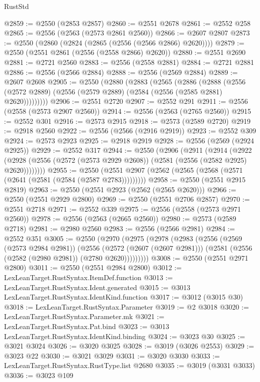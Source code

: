 \begin{lexlean}{RustStd}
\begin{coremodule}
{\begin{coremodule}
{{{{{{{{{{{{{{{{{{{{{{{{{{{{{{{{@2859 := @2550 (@2853 @2857)
@2860 := @2551 @2678
@2861 := @2552 @258
@2865 := @2556 (@2563 (@2573 @2861 @2560))
@2866 := @2607 @2807
@2873 := @2550 (@2860 (@2824 (@2865 (@2556 (@2566 @2866) @2620))))
@2879 := @2550 (@2551 @2861 (@2556 (@2558 @2866) @2620))
@2880 := @2551 @2690
@2881 := @2721 @2560
@2883 := @2556 (@2558 @2881)
@2884 := @2721 @2881
@2886 := @2556 (@2566 @2884)
@2888 := @2556 (@2569 @2884)
@2889 := @2607 @2608
@2905 := @2550
    (@2880
      (@2883
        (@2565
          (@2886
            (@2888
              (@2556 (@2572 @2889) (@2556 (@2579 @2889) (@2584 (@2556 (@2585 @2881) @2620)))))))))
@2906 := @2551 @2720
@2907 := @2552 @291
@2911 := @2556 (@2558 (@2573 @2907 @2560))
@2914 := @2556 (@2563 (@2765 @2560))
@2915 := @2552 @301
@2916 := @2573 @2915
@2918 := @2573 (@2589 @2720)
@2919 := @2918 @2560
@2922 := @2556 (@2566 (@2916 @2919))
@2923 := @2552 @309
@2924 := @2573 @2923
@2925 := @2918 @2919
@2928 := @2556 (@2569 (@2924 @2925))
@2929 := @2552 @317
@2944 := @2550
    (@2906
      (@2911
        (@2914
          (@2922 (@2928 (@2556 (@2572 (@2573 @2929 @2608)) (@2581 (@2556 (@2582 @2925) @2620))))))))
@2955 := @2550 (@2551 @2907 (@2562 (@2565 (@2568 (@2571 (@2641 (@2581 (@2584 (@2587 @2783)))))))))
@2958 := @2550 (@2551 @2915 @2819)
@2963 := @2550 (@2551 @2923 (@2562 (@2565 @2620)))
@2966 := @2550 (@2551 @2929 @2800)
@2969 := @2550 (@2551 @2706 @2857)
@2970 := @2551 @2718
@2971 := @2552 @339
@2975 := @2556 (@2558 (@2573 @2971 @2560))
@2978 := @2556 (@2563 (@2665 @2560))
@2980 := @2573 (@2589 @2718)
@2981 := @2980 @2560
@2983 := @2556 (@2566 @2981)
@2984 := @2552 @351
@3005 := @2550
    (@2970
      (@2975
        (@2978
          (@2983
            (@2556
              (@2569 (@2573 @2984 @2981))
              (@2556
                (@2572 (@2607 (@2607 @2981)))
                (@2581 (@2556 (@2582 (@2980 @2981)) (@2780 @2620)))))))))
@3008 := @2550 (@2551 @2971 @2800)
@3011 := @2550 (@2551 @2984 @2800)
@3012 := LexLeanTarget.RustSyntax.ItemDef.function
@3013 := LexLeanTarget.RustSyntax.Ident.generated
@3015 := @3013 LexLeanTarget.RustSyntax.IdentKind.function
@3017 := @3012 (@3015 @30)
@3018 := LexLeanTarget.RustSyntax.Parameter
@3019 := @2 @3018
@3020 := LexLeanTarget.RustSyntax.Parameter.mk
@3021 := LexLeanTarget.RustSyntax.Pat.bind
@3023 := @3013 LexLeanTarget.RustSyntax.IdentKind.binding
@3024 := @3023 @30
@3025 := @3021 @3024
@3026 := @3020 @3025
@3028 := @3019 (@3026 @2553)
@3029 := @3023 @22
@3030 := @3021 @3029
@3031 := @3020 @3030
@3033 := LexLeanTarget.RustSyntax.RustType.list @2680
@3035 := @3019 (@3031 @3033)
@3036 := @3023 @109
}}}}}}}}}}}}}}}}}}}}}}}}}}}}}}}}
\end{coremodule}}
\end{coremodule}
\end{lexlean}
